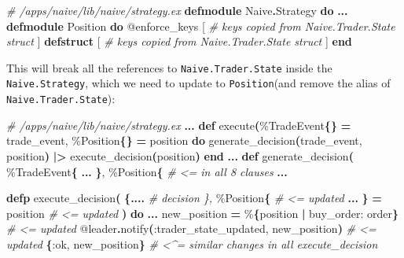 \documentclass[
  oneside]{book}
\newenvironment{Shaded}{\begin{snugshade}}{\end{snugshade}}
\newcommand{\CommentTok}[1]{\textcolor[rgb]{0.56,0.35,0.01}{\textit{#1}}}
\newcommand{\ConstantTok}[1]{\textcolor[rgb]{0.56,0.35,0.01}{#1}}
\newcommand{\FunctionTok}[1]{\textcolor[rgb]{0.13,0.29,0.53}{\textbf{#1}}}
\newcommand{\KeywordTok}[1]{\textcolor[rgb]{0.13,0.29,0.53}{\textbf{#1}}}
\newcommand{\NormalTok}[1]{#1}
\newcommand{\OperatorTok}[1]{\textcolor[rgb]{0.81,0.36,0.00}{\textbf{#1}}}
\newcommand{\OtherTok}[1]{\textcolor[rgb]{0.56,0.35,0.01}{#1}}
\newcommand{\VariableTok}[1]{\textcolor[rgb]{0.00,0.00,0.00}{#1}}
\begin{document}
\begin{Shaded}
\begin{Highlighting}[]
\CommentTok{\# /apps/naive/lib/naive/strategy.ex}
\KeywordTok{defmodule} \ConstantTok{Naive}\OperatorTok{.}\ConstantTok{Strategy} \KeywordTok{do}
  \OperatorTok{...}
  \KeywordTok{defmodule} \ConstantTok{Position} \KeywordTok{do}
    \OtherTok{@enforce\_keys} \OtherTok{[}
    \CommentTok{\# keys copied from \textasciigrave{}Naive.Trader.State\textasciigrave{} struct}
    \OtherTok{]}
    \KeywordTok{defstruct} \OtherTok{[}
    \CommentTok{\# keys copied from \textasciigrave{}Naive.Trader.State\textasciigrave{} struct}
    \OtherTok{]}
  \KeywordTok{end}
\end{Highlighting}
\end{Shaded}

This will break all the references to \texttt{Naive.Trader.State} inside the \texttt{Naive.Strategy}, which we need to update to \texttt{Position}(and remove the alias of \texttt{Naive.Trader.State}):

\begin{Shaded}
\begin{Highlighting}[]
  \CommentTok{\# /apps/naive/lib/naive/strategy.ex}
  \OperatorTok{...}
  \KeywordTok{def}\NormalTok{ execute}\FunctionTok{(}\NormalTok{\%}\ConstantTok{TradeEvent}\FunctionTok{\{\}} \OperatorTok{=}\NormalTok{ trade\_event, \%}\ConstantTok{Position}\FunctionTok{\{\}} \OperatorTok{=}\NormalTok{ position }\KeywordTok{do}
\NormalTok{    generate\_decision}\FunctionTok{(}\NormalTok{trade\_event, position}\FunctionTok{)}
    \OperatorTok{|\textgreater{}}\NormalTok{ execute\_decision}\FunctionTok{(}\NormalTok{position}\FunctionTok{)}
  \KeywordTok{end}
  \OperatorTok{...}
  \KeywordTok{def}\NormalTok{ generate\_decision}\FunctionTok{(}
\NormalTok{        \%}\ConstantTok{TradeEvent}\FunctionTok{\{}
          \OperatorTok{...}
        \FunctionTok{\}}\NormalTok{,}
\NormalTok{        \%}\ConstantTok{Position}\FunctionTok{\{} \CommentTok{\# \textless{}= in all 8 clauses}
        \OperatorTok{...}

  \KeywordTok{defp}\NormalTok{ execute\_decision}\FunctionTok{(}
    \FunctionTok{\{}\OperatorTok{....} \CommentTok{\# decision \},}
\NormalTok{    \%}\ConstantTok{Position}\FunctionTok{\{} \CommentTok{\# \textless{}= updated}
      \OperatorTok{...}
    \FunctionTok{\}} \OperatorTok{=}\NormalTok{ position }\CommentTok{\# \textless{}= updated}
  \FunctionTok{)} \KeywordTok{do}
    \OperatorTok{...}
\NormalTok{    new\_position }\OperatorTok{=}\NormalTok{ \%}\FunctionTok{\{}\NormalTok{position }\OperatorTok{|} \VariableTok{buy\_order:}\NormalTok{ order}\FunctionTok{\}} \CommentTok{\# \textless{}= updated}
    \OtherTok{@leader}\OperatorTok{.}\NormalTok{notify}\FunctionTok{(}\VariableTok{:trader\_state\_updated}\NormalTok{, new\_position}\FunctionTok{)} \CommentTok{\# \textless{}= updated}
    \FunctionTok{\{}\VariableTok{:ok}\NormalTok{, new\_position}\FunctionTok{\}} \CommentTok{\# \textless{}\^{}= similar changes in all execute\_decision}
\end{Highlighting}
\end{Shaded}
\end{document}
